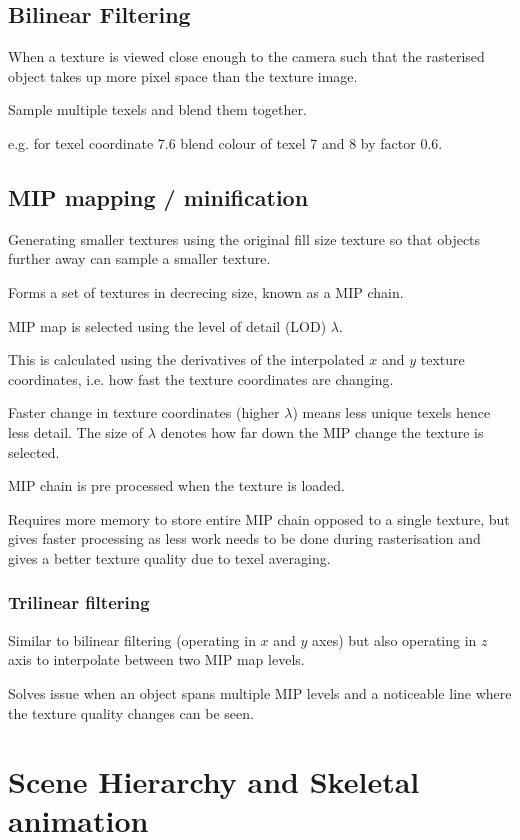 \documentclass[a4paper]{article}
\begin{document}
\subsection{Bilinear Filtering}

When a texture is viewed close enough to the camera such that the rasterised
object takes up more pixel space than the texture image.

Sample multiple texels and blend them together.

e.g. for texel coordinate 7.6 blend colour of texel 7 and 8 by factor 0.6.

\subsection{MIP mapping /  minification}

Generating smaller textures using the original fill size texture so that objects
further away can sample a smaller texture.

Forms a set of textures in decrecing size, known as a MIP chain.

MIP map is selected using the level of detail (LOD) $\lambda$.

This is calculated using the derivatives of the interpolated $x$ and $y$
texture coordinates, i.e. how fast the texture coordinates are changing.

Faster change in texture coordinates (higher $\lambda$) means less unique texels
hence less detail. The size of $\lambda$ denotes how far down the MIP change the
texture is selected.

MIP chain is pre processed when the texture is loaded.

Requires more memory to store entire MIP chain opposed to a single texture, but
gives faster processing as less work needs to be done during rasterisation and
gives a better texture quality due to texel averaging.

\subsubsection{Trilinear filtering}

Similar to bilinear filtering (operating in $x$ and $y$ axes) but also operating
in $z$ axis to interpolate between two MIP map levels.

Solves issue when an object spans multiple MIP levels and a noticeable line where
the texture quality changes can be seen.

\section{Scene Hierarchy and Skeletal animation}
\end{document}
